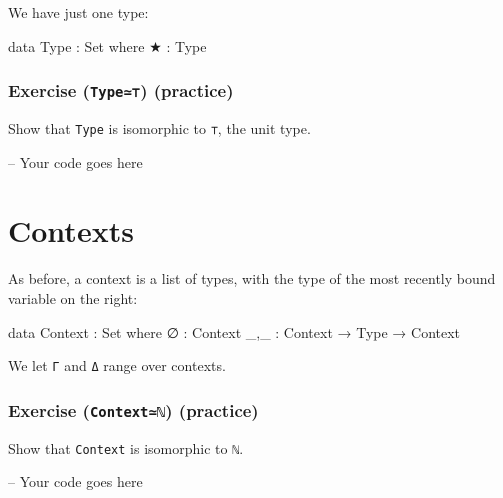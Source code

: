 We have just one type:

\begin{fence}
\begin{code}
data Type : Set where
  ★ : Type
\end{code}
\end{fence}

\hypertarget{exercise-type-practice}{%
\subsubsection{\texorpdfstring{Exercise (\texttt{Type≃⊤})
(practice)}{Exercise (Type≃⊤) (practice)}}\label{exercise-type-practice}}

Show that \texttt{Type} is isomorphic to \texttt{⊤}, the unit type.

\begin{fence}
\begin{code}
-- Your code goes here
\end{code}
\end{fence}

\hypertarget{contexts}{%
\section{Contexts}\label{contexts}}

As before, a context is a list of types, with the type of the most
recently bound variable on the right:

\begin{fence}
\begin{code}
data Context : Set where
  ∅   : Context
  _,_ : Context → Type → Context
\end{code}
\end{fence}

We let \texttt{Γ} and \texttt{Δ} range over contexts.

\hypertarget{exercise-contextux2115-practice}{%
\subsubsection{\texorpdfstring{Exercise (\texttt{Context≃ℕ})
(practice)}{Exercise (Context≃ℕ) (practice)}}\label{exercise-contextux2115-practice}}

Show that \texttt{Context} is isomorphic to \texttt{ℕ}.

\begin{fence}
\begin{code}
-- Your code goes here
\end{code}
\end{fence}

